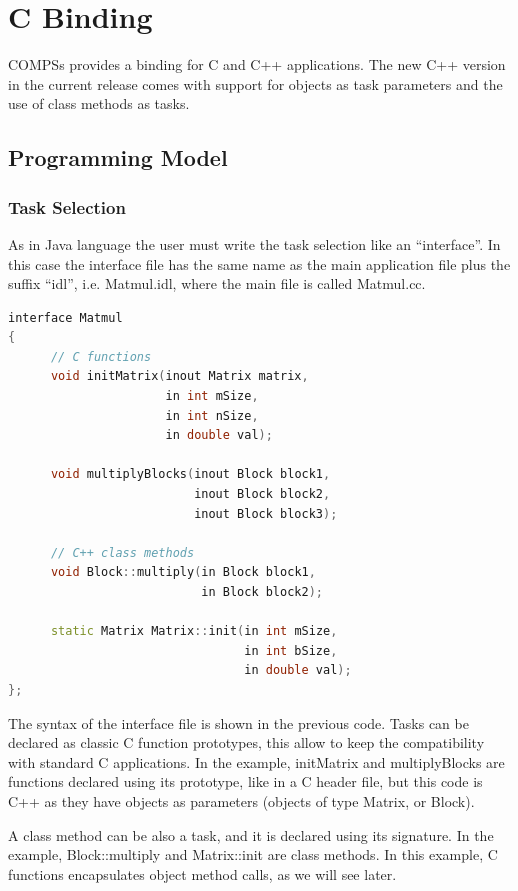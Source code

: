 \section{C Binding}
\label{sec:C}

COMPSs provides a binding for C and C++ applications. The new C++ version in the current release 
comes with support for objects as task parameters and the use of class methods as tasks.

\subsection{Programming Model}

\subsubsection{Task Selection}
As in Java language the user must write the task selection like an ``interface''. In this case 
the interface file has the same name as the main application file plus the suffix ``idl'', 
i.e. Matmul.idl, where the main file is called Matmul.cc.

\begin{lstlisting}[language=C++]
interface Matmul
{
      // C functions
      void initMatrix(inout Matrix matrix,
                      in int mSize,
                      in int nSize,
                      in double val);
                      
      void multiplyBlocks(inout Block block1,
                          inout Block block2,
                          inout Block block3);
                          
      // C++ class methods
      void Block::multiply(in Block block1,
                           in Block block2);
                           
      static Matrix Matrix::init(in int mSize,
                                 in int bSize,
                                 in double val);
};
\end{lstlisting}

The syntax of the interface file is shown in the previous code. Tasks can be declared as classic 
C function prototypes, this allow to keep the compatibility with standard C applications. 
In the example, initMatrix and multiplyBlocks are functions declared using its prototype, 
like in a C header file, but this code is C++ as they have objects as parameters (objects of 
type Matrix, or Block).

A class method can be also a task, and it is declared using its signature. In the example, 
Block::multiply and Matrix::init are class methods. In this example, C functions encapsulates 
object method calls, as we will see later.

